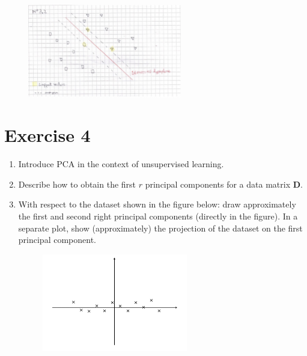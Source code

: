 \documentclass[a4paper,11pt,oneside]{book}
\begin{document}
\begin{enumerate}
        \begin{solution}
            \begin{figure}[H]
                \centering
                \includegraphics[width=0.6\textwidth,height=0.4\textheight,keepaspectratio]{images/2_3_12_Feb_2018.png}
            \end{figure}
        \end{solution}
\end{enumerate}

\clearpage
\section{Exercise 4}
\begin{enumerate}
    \item Introduce PCA in the context of unsupervised learning.
    \item Describe how to obtain the first $r$ principal components for a data matrix $\mathbf{D}$.
    \item With respect to the dataset shown in the figure below: draw approximately the first and second right principal components (directly in the figure). In a separate plot, show (approximately) the projection of the dataset on the first principal component.
        \begin{figure}[H]
            \centering
            \includegraphics[width=0.6\textwidth,height=0.4\textheight,keepaspectratio]{images/4_12_Feb_2018.png}
        \end{figure}
\end{enumerate}
\end{document}
